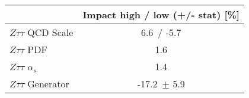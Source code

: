 \begin{tabular}{| l || c | }
\hline
 & Impact high / low (+/- stat) [\%]\tabularnewline
\hline
$Z\tau\tau$ QCD Scale & 6.6\, / -5.7 \tabularnewline
$Z\tau\tau$ PDF & 1.6 \tabularnewline
$Z\tau\tau$ $\alpha_s$ & 1.4 \tabularnewline
$Z\tau\tau$ Generator & -17.2\, $\pm$  5.9  \tabularnewline
\hline
\end{tabular}
